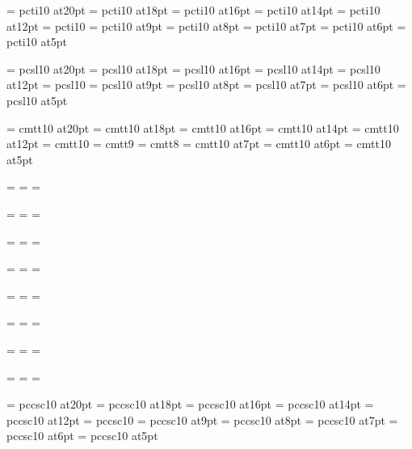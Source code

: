 \font\twentyit=     pcti10 at20pt
\font\eighteenit=   pcti10 at18pt
\font\sixteenit=    pcti10 at16pt
\font\fourteenit=   pcti10 at14pt
\font\twelveit=     pcti10 at12pt
\font\tenit=        pcti10 %
\font\nineit=       pcti10 at9pt
\font\eightit=      pcti10 at8pt
\font\sevenit=      pcti10 at7pt
\font\sixit=        pcti10 at6pt
\font\fiveit=       pcti10 at5pt

\font\twentysl=     pcsl10 at20pt
\font\eighteensl=   pcsl10 at18pt
\font\sixteensl=    pcsl10 at16pt
\font\fourteensl=   pcsl10 at14pt
\font\twelvesl=     pcsl10 at12pt
\font\tensl=        pcsl10 %
\font\ninesl=       pcsl10 at9pt
\font\eightsl=      pcsl10 at8pt
\font\sevensl=      pcsl10 at7pt
\font\sixsl=        pcsl10 at6pt
\font\fivesl=       pcsl10 at5pt


\font\twentytt=     cmtt10 at20pt
\font\eighteentt=   cmtt10 at18pt
\font\sixteentt=    cmtt10 at16pt
\font\fourteentt=   cmtt10 at14pt
\font\twelvett=     cmtt10 at12pt
\font\tentt=        cmtt10
\font\ninett=       cmtt9
\font\eighttt=      cmtt8
\font\seventt=      cmtt10 at7pt
\font\sixtt=        cmtt10 at6pt
\font\fivett=       cmtt10 at5pt




=\tenrm
{}=\sevenrm
{}=\fiverm
\def\rm{\fam=0 \tenrm}

=\teni
{}=\seveni
{}=\fivei
\def\mit{\fam=1}

=\tensy
{}=\sevensy
{}=\fivesy
\def\cal{\fam=2}

=\tenex
{}=\sevenex
{}=\fiveex


\def\it{\fam=\itfam \tenit}
\textfont\itfam=\tenit
\scriptfont\itfam=\sevenit
\scriptscriptfont\itfam=\fiveit

\def\sl{\fam=\slfam \tensl}
\textfont\slfam=\tensl
\scriptfont\slfam=\sevensl
\scriptscriptfont\slfam=\fivesl

\def\bf{\fam=\bffam \tenbf}
\textfont\bffam=\tenbf
\scriptfont\bffam=\sevenbf
\scriptscriptfont\bffam=\fivebf

\def\tt{\fam=\ttfam \tentt}
\textfont\ttfam=\tentt
\scriptfont\ttfam=\seventt
\scriptscriptfont\ttfam=\fivett



\font\twentycaps=      pccsc10 at20pt
\font\eighteencaps=    pccsc10 at18pt
\font\sixteencaps=     pccsc10 at16pt
\font\fourteencaps=    pccsc10 at14pt
\font\twelvecaps=      pccsc10 at12pt
\font\caps=            pccsc10 %
\font\ninecaps=        pccsc10 at9pt
\font\eightcaps=       pccsc10 at8pt
\font\sevencaps=       pccsc10 at7pt
\font\sixcaps=         pccsc10 at6pt
\font\fivecaps=        pccsc10 at5pt


\rm 